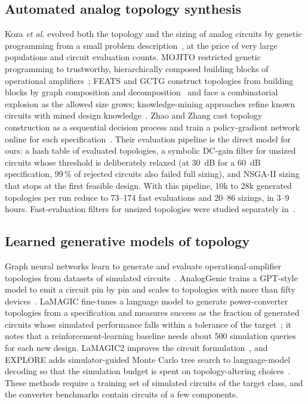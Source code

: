 \documentclass[journal]{IEEEtran}
\begin{document}
\subsection{Automated analog topology synthesis}
Koza \emph{et al.} evolved both the topology and the sizing of analog circuits by genetic programming from
a small problem description~\cite{koza1997analog}, at the price of very large populations and circuit
evaluation counts. MOJITO restricted genetic programming to trustworthy, hierarchically composed building
blocks of operational amplifiers~\cite{mcconaghy2011mojito}; FEATS and GCTG construct topologies from
building blocks by graph composition and decomposition~\cite{meissner2015feats,zhao2020gctg} and face a
combinatorial explosion as the allowed size grows; knowledge-mining approaches refine known circuits with
mined design knowledge~\cite{jiao2015kmr}. Zhao and Zhang cast topology construction as a sequential
decision process and train a policy-gradient network online for each specification~\cite{zhao2022drl}.
Their evaluation pipeline is the direct model for ours: a hash table of evaluated topologies, a symbolic
DC-gain filter for unsized circuits whose threshold is deliberately relaxed (at \SI{30}{dB} for a
\SI{60}{dB} specification, 99\,\% of rejected circuits also failed full sizing), and NSGA-II
sizing~\cite{deb2002nsga2} that stops at the first feasible design. With this pipeline, 10k to 28k
generated topologies per run reduce to 73--174 fast evaluations and 20--86 sizings, in 3--9 hours.
Fast-evaluation filters for unsized topologies were studied separately in~\cite{zhao2018fast}.

\subsection{Learned generative models of topology}
Graph neural networks learn to generate and evaluate operational-amplifier topologies from datasets of
simulated circuits~\cite{dong2023cktgnn}. AnalogGenie trains a GPT-style model to emit a circuit pin by
pin and scales to topologies with more than fifty devices~\cite{gao2025analoggenie}. LaMAGIC fine-tunes
a language model to generate power-converter topologies from a specification and measures success as the
fraction of generated circuits whose simulated performance falls within a tolerance of the
target~\cite{chang2024lamagic}; it notes that a reinforcement-learning baseline needs about 500 simulation
queries for each new design. LaMAGIC2 improves the circuit formulation~\cite{chang2025lamagic2}, and
EXPLORE adds simulator-guided Monte Carlo tree search to language-model decoding so that the simulation
budget is spent on topology-altering choices~\cite{zhou2026explore}. These methods require a training set
of simulated circuits of the target class, and the converter benchmarks contain circuits of a few
components.
\end{document}
